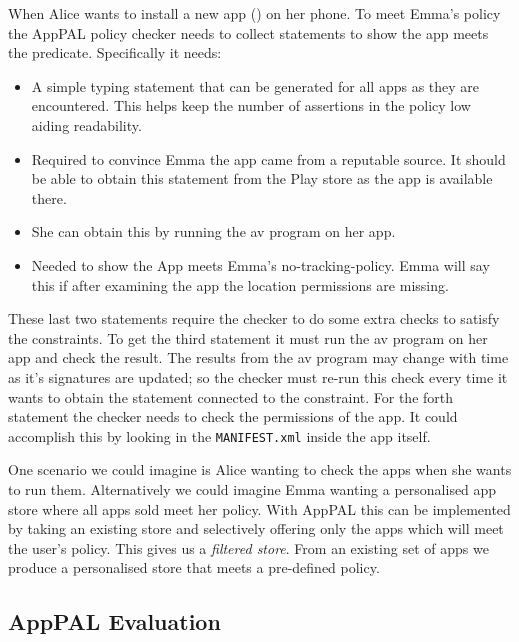 \documentclass{scrartcl}
\begin{document}
When Alice wants to install a new app () on her phone.
To meet Emma's policy the AppPAL policy checker needs to collect statements to show the app meets the  predicate.
Specifically it needs:
\begin{itemize}
  \item{}
    A simple typing statement that can be generated for all apps as they are encountered.
    This helps keep the number of  assertions in the policy low aiding readability.
  \item{}
    Required to convince Emma the app came from a reputable source.
    It should be able to obtain this statement from the Play store as the app is available there.
  \item{}
    She can obtain this by running the \ac{av} program on her app.
  \item{}
    Needed to show the App meets Emma's no-tracking-policy.
    Emma will say this if after examining the app the location permissions are missing.
\end{itemize}
These last two statements require the checker to do some extra checks to satisfy the constraints.
To get the third statement it must run the \ac{av} program on her app and check the result.
The results from the \ac{av} program may change with time as it's signatures are updated;
  so the checker must re-run this check every time it wants to obtain the statement connected to the constraint.
For the forth statement the checker needs to check the permissions of the app.
It could accomplish this by looking in the \texttt{MANIFEST.xml} inside the app itself.

One scenario we could imagine is Alice wanting to check the apps when she wants to run them.
Alternatively we could imagine Emma wanting a personalised app store where all apps sold meet her policy.
With AppPAL this can be implemented by taking an existing store and selectively offering only the apps which will meet the user's policy.
This gives us a \emph{filtered store}.
From an existing set of apps we produce a personalised store that meets a pre-defined policy.

\subsection{AppPAL Evaluation}
\end{document}
